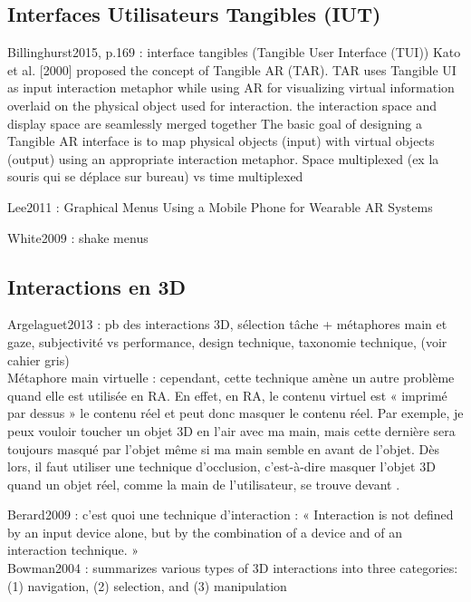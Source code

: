 \subsection{Interfaces Utilisateurs Tangibles (IUT)}
Billinghurst2015, p.169 : interface tangibles (Tangible User Interface (TUI))
Kato et al. [2000] proposed the concept of Tangible AR (TAR). TAR uses Tangible UI as input interaction metaphor while using AR for visualizing virtual information overlaid on the physical object used for interaction. the interaction space and display space are seamlessly merged together
The basic goal of designing a Tangible AR interface is to map physical objects (input) with virtual objects (output) using an appropriate interaction metaphor.
Space multiplexed (ex la souris qui se déplace sur bureau) vs time multiplexed

Lee2011 : Graphical Menus Using a Mobile Phone for Wearable AR Systems

White2009 : shake menus

\subsection{Interactions en 3D}
Argelaguet2013 : pb des interactions 3D, sélection tâche + métaphores main et gaze, subjectivité vs performance, design technique, taxonomie technique,  (voir cahier gris)\\
Métaphore main virtuelle : cependant, cette technique amène un autre problème quand elle est utilisée en RA. En effet, en RA, le contenu virtuel est « imprimé par dessus » le contenu réel et peut donc masquer le contenu réel. Par exemple, je peux vouloir toucher un objet 3D en l'air avec ma main, mais cette dernière sera toujours masqué par l'objet même si ma main semble en avant de l'objet. Dès lors, il faut utiliser une technique d'occlusion, c'est-à-dire masquer l'objet 3D quand un objet réel, comme la main de l'utilisateur, se trouve devant .



Berard2009 : c'est quoi une technique d'interaction : « Interaction is not defined by an input device alone, but by the combination of a device and of an interaction technique. »\\
Bowman2004 : summarizes various types of 3D interactions into three categories: (1) navigation, (2) selection, and (3)
manipulation

